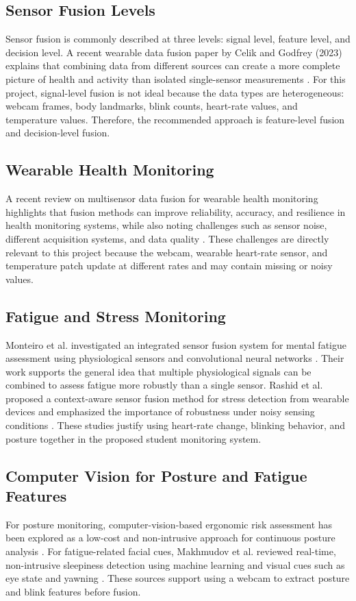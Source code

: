 \documentclass[11pt,a4paper]{article}
\begin{document}
\subsection{Sensor Fusion Levels}
Sensor fusion is commonly described at three levels: signal level, feature level, and decision level. A recent wearable data fusion paper by Celik and Godfrey (2023) explains that combining data from different sources can create a more complete picture of health and activity than isolated single-sensor measurements \cite{celik2023wearablefusion}. For this project, signal-level fusion is not ideal because the data types are heterogeneous: webcam frames, body landmarks, blink counts, heart-rate values, and temperature values. Therefore, the recommended approach is feature-level fusion and decision-level fusion.

\subsection{Wearable Health Monitoring}
A recent review on multisensor data fusion for wearable health monitoring highlights that fusion methods can improve reliability, accuracy, and resilience in health monitoring systems, while also noting challenges such as sensor noise, different acquisition systems, and data quality \cite{john2024wearablefusion}. These challenges are directly relevant to this project because the webcam, wearable heart-rate sensor, and temperature patch update at different rates and may contain missing or noisy values.

\subsection{Fatigue and Stress Monitoring}
Monteiro et al. investigated an integrated sensor fusion system for mental fatigue assessment using physiological sensors and convolutional neural networks \cite{monteiro2020fatiguefusion}. Their work supports the general idea that multiple physiological signals can be combined to assess fatigue more robustly than a single sensor. Rashid et al. proposed a context-aware sensor fusion method for stress detection from wearable devices and emphasized the importance of robustness under noisy sensing conditions \cite{rashid2023stressfusion}. These studies justify using heart-rate change, blinking behavior, and posture together in the proposed student monitoring system.

\subsection{Computer Vision for Posture and Fatigue Features}
For posture monitoring, computer-vision-based ergonomic risk assessment has been explored as a low-cost and non-intrusive approach for continuous posture analysis \cite{agostinelli2024ergonomics}. For fatigue-related facial cues, Makhmudov et al. reviewed real-time, non-intrusive sleepiness detection using machine learning and visual cues such as eye state and yawning \cite{makhmudov2024fatigue}. These sources support using a webcam to extract posture and blink features before fusion.
\end{document}
